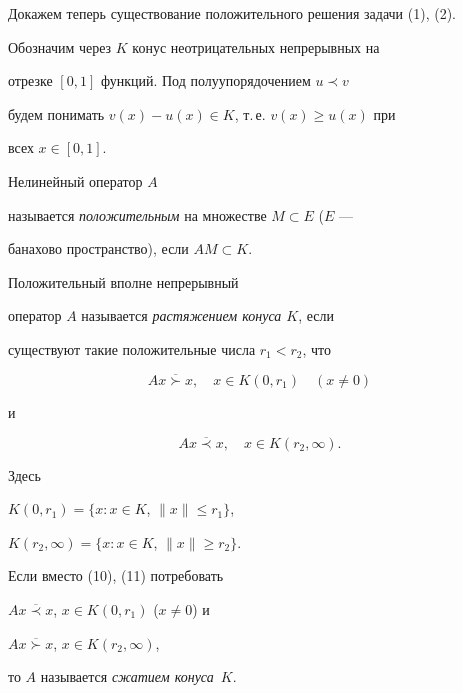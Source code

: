 Докажем теперь существование положительного решения задачи (1), (2). 


Обозначим через $K$ конус неотрицательных непрерывных на


отрезке $[0,1]$ функций. Под полуупорядочением $u\prec v$


будем понимать $v(x)-u(x)\in K$, т.\,е. $v(x)\geq u(x)$ при


всех $x\in [0,1]$.





\begin{defn} 


Нелинейный оператор $A$ 


называется {\it положительным} на множестве $M\subset E$ ($E$ --- 


банахово пространство), если $AM \subset K$.


\end{defn}





\begin{defn} 


Положительный вполне непрерывный 


оператор $A$ называется {\it растяжением конуса $K$}, если


существуют такие положительные числа $r_1<r_2$, что


\begin{equation}


Ax \overline{\succ} x,\quad x\in K(0,r_1) \quad (x\ne0)


\end{equation}


и


\begin{equation}


Ax \overline{\prec} x,\quad x\in K(r_2,\infty).


\end{equation}


Здесь 


$K(0,r_1)=\{x: x\in K$, $\| x\| \leq r_1\}$, 


$K(r_2,\infty)=\{x:x\in K$, $\| x\| \geq r_2\}$.


Если вместо (10), (11) потребовать 


$Ax \overline{\prec} x$, $x\in K(0,r_1)$ ($x\ne 0$) и 


$Ax \overline{\succ} x$, $x\in K(r_2,\infty)$,


то $A$ называется {\it сжатием конуса~$K$}.


\end{defn}





